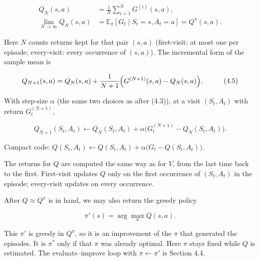 \begin{equation}
\begin{aligned}
Q_N(s,a)
&=
\frac{1}{N}\sum_{i=1}^{N} G^{(i)}(s,a),
\\
\lim_{N\to\infty} Q_N(s,a)
&=
\mathbb{E}_\pi[G_t \mid S_t=s,A_t=a]
=
Q^\pi(s,a).
\end{aligned}
\tag{4.4}
\end{equation}

Here $N$ counts returns kept for that pair $(s,a)$ (first-visit: at most one per episode; every-visit: every occurrence of $(s,a)$). The incremental form of the sample mean is

\begin{equation}
\begin{aligned}
Q_{N+1}(s,a)
&=
Q_N(s,a) + \frac{1}{N+1}\Bigl( G^{(N+1)}(s,a) - Q_N(s,a) \Bigr).
\end{aligned}
\tag{4.5}
\end{equation}

With step-size $\alpha$ (the same two choices as after (4.3)), at a visit $(S_t,A_t)$ with return $G_t^{(N+1)}$,

\begin{equation}
Q_{N+1}(S_t,A_t)
\leftarrow
Q_N(S_t,A_t) + \alpha \bigl( G_t^{(N+1)} - Q_N(S_t,A_t) \bigr).
\tag{4.6}
\end{equation}

Compact code: $Q(S_t,A_t)\leftarrow Q(S_t,A_t)+\alpha\bigl(G_t-Q(S_t,A_t)\bigr)$.

The returns for $Q$ are computed the same way as for $V$, from the last time back to the first. First-visit updates $Q$ only on the first occurrence of $(S_t,A_t)$ in the episode; every-visit updates on every occurrence.

After $Q\approx Q^\pi$ is in hand, we may also return the greedy policy

\[
\pi'(s)=\arg\max_a Q(s,a).
\]

This $\pi'$ is greedy in $Q^\pi$, so it is an improvement of the $\pi$ that generated the episodes. It is $\pi^*$ only if that $\pi$ was already optimal. Here $\pi$ stays fixed while $Q$ is estimated. The evaluate--improve loop with $\pi\leftarrow\pi'$ is Section 4.4.

